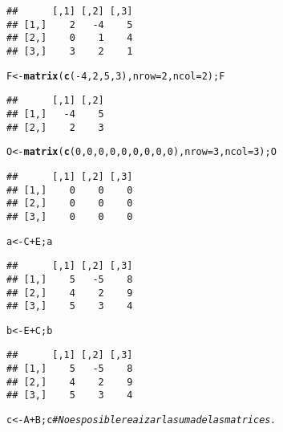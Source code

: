 \documentclass{article}\usepackage[]{graphicx}\usepackage[]{color}
\makeatletter
\newcommand{\hlnum}[1]{\textcolor[rgb]{0.686,0.059,0.569}{#1}}%
\newcommand{\hlcom}[1]{\textcolor[rgb]{0.678,0.584,0.686}{\textit{#1}}}%
\newcommand{\hlopt}[1]{\textcolor[rgb]{0,0,0}{#1}}%
\newcommand{\hlstd}[1]{\textcolor[rgb]{0.345,0.345,0.345}{#1}}%
\newcommand{\hlkwb}[1]{\textcolor[rgb]{0.69,0.353,0.396}{#1}}%
\newcommand{\hlkwc}[1]{\textcolor[rgb]{0.333,0.667,0.333}{#1}}%
\newcommand{\hlkwd}[1]{\textcolor[rgb]{0.737,0.353,0.396}{\textbf{#1}}}%
\newenvironment{kframe}{%
 \def\at@end@of@kframe{}%
 \ifinner\ifhmode%
  \def\at@end@of@kframe{\end{minipage}}%
  \begin{minipage}{\columnwidth}%
 \fi\fi%
 \def\FrameCommand##1{\hskip\@totalleftmargin \hskip-\fboxsep
 \colorbox{shadecolor}{##1}\hskip-\fboxsep
     \hskip-\linewidth \hskip-\@totalleftmargin \hskip\columnwidth}%
 \MakeFramed {\advance\hsize-\width
   \@totalleftmargin\z@ \linewidth\hsize
   \@setminipage}}%
 {\par\unskip\endMakeFramed%
 \at@end@of@kframe}
\newenvironment{knitrout}{}{} %
\makeatother
\begin{document}
\begin{knitrout}
\begin{kframe}
\begin{alltt}
\end{alltt}
\begin{verbatim}
##      [,1] [,2] [,3]
## [1,]    2   -4    5
## [2,]    0    1    4
## [3,]    3    2    1
\end{verbatim}
\begin{alltt}
\hlstd{F} \hlkwb{<-} \hlkwd{matrix}\hlstd{(}\hlkwd{c}\hlstd{(}\hlopt{-}\hlnum{4}\hlstd{,} \hlnum{2}\hlstd{,} \hlnum{5}\hlstd{,} \hlnum{3}\hlstd{),} \hlkwc{nrow}\hlstd{=}\hlnum{2}\hlstd{,} \hlkwc{ncol}\hlstd{=}\hlnum{2}\hlstd{);F}
\end{alltt}
\begin{verbatim}
##      [,1] [,2]
## [1,]   -4    5
## [2,]    2    3
\end{verbatim}
\begin{alltt}
\hlstd{O} \hlkwb{<-} \hlkwd{matrix}\hlstd{(}\hlkwd{c}\hlstd{(}\hlnum{0}\hlstd{,}\hlnum{0}\hlstd{,}\hlnum{0}\hlstd{,}\hlnum{0}\hlstd{,}\hlnum{0}\hlstd{,}\hlnum{0}\hlstd{,}\hlnum{0}\hlstd{,}\hlnum{0}\hlstd{,}\hlnum{0}\hlstd{),} \hlkwc{nrow}\hlstd{=}\hlnum{3}\hlstd{,} \hlkwc{ncol}\hlstd{=}\hlnum{3}\hlstd{);O}
\end{alltt}
\begin{verbatim}
##      [,1] [,2] [,3]
## [1,]    0    0    0
## [2,]    0    0    0
## [3,]    0    0    0
\end{verbatim}
\begin{alltt}
\hlstd{a}\hlkwb{<-}\hlstd{C}\hlopt{+}\hlstd{E; a}
\end{alltt}
\begin{verbatim}
##      [,1] [,2] [,3]
## [1,]    5   -5    8
## [2,]    4    2    9
## [3,]    5    3    4
\end{verbatim}
\begin{alltt}
\hlstd{b}\hlkwb{<-}\hlstd{E}\hlopt{+}\hlstd{C; b}
\end{alltt}
\begin{verbatim}
##      [,1] [,2] [,3]
## [1,]    5   -5    8
## [2,]    4    2    9
## [3,]    5    3    4
\end{verbatim}
\begin{alltt}
\hlstd{c}\hlkwb{<-}\hlstd{A}\hlopt{+}\hlstd{B; c} \hlcom{#No es posible reaizar la suma de las matrices.}
\end{alltt}



\end{kframe}
\end{knitrout}
\end{document}

